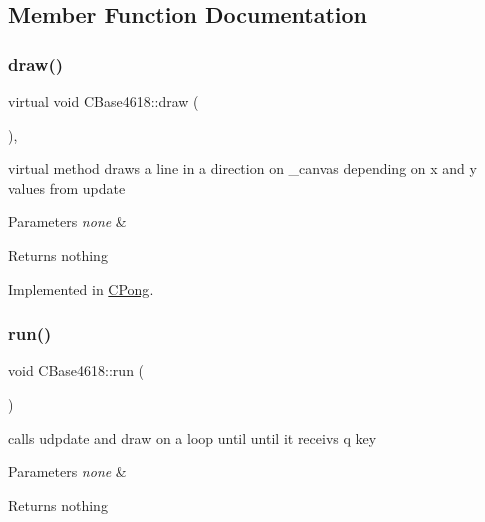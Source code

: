 \subsection{Member Function Documentation}
\hypertarget{class_c_base4618_a0987bf28e9beed4753d3628fcddc3315}{}\label{class_c_base4618_a0987bf28e9beed4753d3628fcddc3315} 
\subsubsection{\texorpdfstring{draw()}{draw()}}
{\footnotesize\ttfamily virtual void C\+Base4618\+::draw (\begin{DoxyParamCaption}{ }\end{DoxyParamCaption})\hspace{0.3cm}{\ttfamily [protected]}, {}}



virtual method draws a line in a direction on \+\_\+canvas depending on x and y values from update 


\begin{DoxyParams}{Parameters}
{\em none} & \\
\hline
\end{DoxyParams}
\begin{DoxyReturn}{Returns}
nothing 
\end{DoxyReturn}


Implemented in \hyperlink{class_c_pong_ae5c14ff09d074474ffd4f220b21dc00f}{C\+Pong}.

\hypertarget{class_c_base4618_a535e816d735d10d6048dd39cd893d393}{}\label{class_c_base4618_a535e816d735d10d6048dd39cd893d393} 
\subsubsection{\texorpdfstring{run()}{run()}}
{\footnotesize\ttfamily void C\+Base4618\+::run (\begin{DoxyParamCaption}{ }\end{DoxyParamCaption})}



calls udpdate and draw on a loop until until it receivs q key 


\begin{DoxyParams}{Parameters}
{\em none} & \\
\hline
\end{DoxyParams}
\begin{DoxyReturn}{Returns}
nothing 
\end{DoxyReturn}
\hypertarget{class_c_base4618_a1e2f3c16eb99b5bfdd5d5254aee39ee6}{}\label{class_c_base4618_a1e2f3c16eb99b5bfdd5d5254aee39ee6} 
